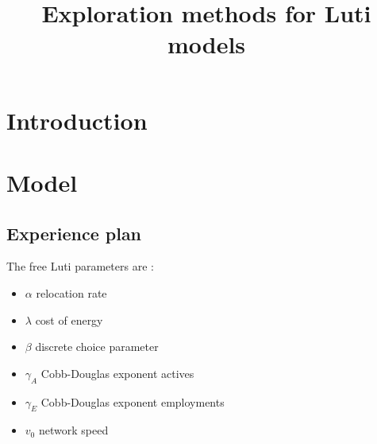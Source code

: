 


\title{Exploration methods for Luti models}
\author{}
\date{}


\maketitle

\justify





\section{Introduction}




\section{Model}




\subsection{Experience plan}

The free Luti parameters are :
\begin{itemize}
	\item $\alpha$ relocation rate
	\item $\lambda$ cost of energy
	\item $\beta$ discrete choice parameter
	\item $\gamma_A$ Cobb-Douglas exponent actives
	\item $\gamma_E$ Cobb-Douglas exponent employments
	\item $v_0$ network speed
\end{itemize}



